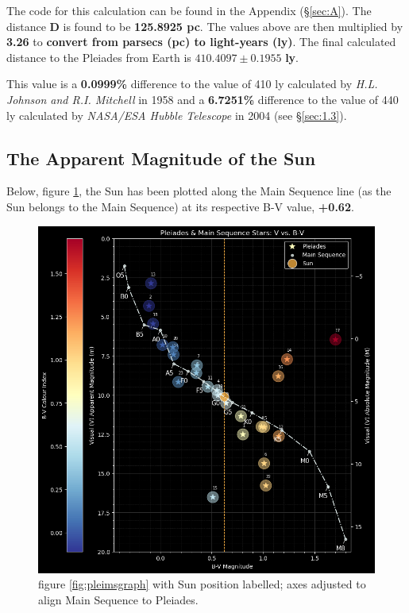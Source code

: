\documentclass[12pt]{article}
\begin{document}
The code for this calculation can be found in the Appendix (§\ref{sec:A}). The distance \textbf{D} is found to be \textbf{125.8925 pc}. The values above are then multiplied by \textbf{3.26} to \textbf{convert from parsecs (pc) to light-years (ly)}.
The final calculated distance to the Pleiades from Earth is $\mathbf{410.4097 \pm 0.1955}$ \textbf{ly}.

This value is a \textbf{0.0999\%} difference to the value of 410 ly calculated by \textit{H.L. Johnson and R.I. Mitchell} in 1958 and a \textbf{6.7251\%} difference to the value of 440 ly calculated by 
\textit{NASA/ESA Hubble Telescope} in 2004 (see §\ref{sec:1.3}).

\subsection{The Apparent Magnitude of the Sun} \label{sec:3.2}

Below, figure \ref{fig:sunfeature}, the Sun has been plotted along the Main Sequence line (as the Sun belongs to the Main Sequence) at its respective B-V value, \textbf{+0.62}.

\begin{figure}[H]
    \centering
    \includegraphics[width=12.5cm]{pleimsgraph sun.png}
    \caption{\centering figure \ref{fig:pleimsgraph} with Sun position labelled; axes adjusted to align Main Sequence to Pleiades.}
    \label{fig:sunfeature}
\end{figure}
\end{document}
